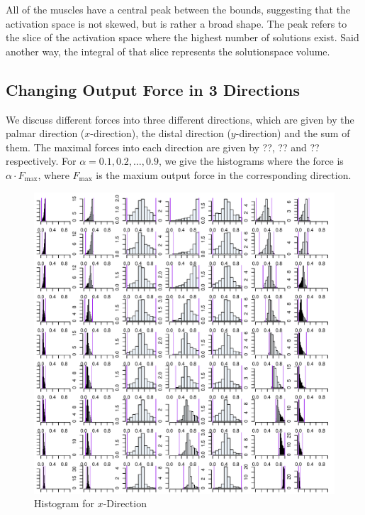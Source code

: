 All of the muscles have a central peak between the bounds, suggesting that the activation space is not skewed, but is rather a broad shape. The peak refers to the slice of the activation space where the highest number of solutions exist. Said another way, the integral of that slice represents the solutionspace volume.




\subsection{Changing Output Force in 3 Directions}
We discuss different forces into three different directions, which are given by the palmar direction ($x$-direction), the distal direction ($y$-direction) and the sum of them. The maximal forces into each direction are given by ??, ?? and ?? respectively. For $\alpha = 0.1, 0.2, \dots, 0.9$, we give the histograms where the force is $\alpha \cdot F_{\max}$, where $F_{\max}$ is the maxium output force in the corresponding direction. 

\begin{figure}[ht]
   \begin{center}
    \includegraphics[width=1.0\textwidth]{XalphaProgression.pdf}
  \end{center}
  \caption{Histogram for $x$-Direction}
  \label{fig_xhisto}
\end{figure}


